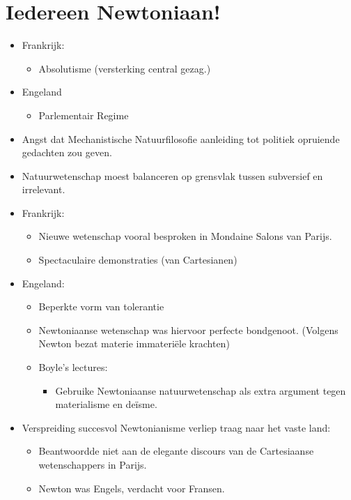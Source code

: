 \documentclass{article}
\begin{document}
  \section{Iedereen Newtoniaan!}
    \begin{itemize}
      \item Frankrijk:
      \begin{itemize}
        \item Absolutisme (versterking central gezag.)
      \end{itemize}
      \item Engeland
      \begin{itemize}
        \item Parlementair Regime
      \end{itemize}
      \item Angst dat Mechanistische Natuurfilosofie aanleiding tot politiek opruiende gedachten zou geven.
      \item Natuurwetenschap moest balanceren op grensvlak tussen subversief en irrelevant.
      \item Frankrijk:
      \begin{itemize}
        \item Nieuwe wetenschap vooral besproken in Mondaine Salons van Parijs.
        \item Spectaculaire demonstraties (van Cartesianen)
      \end{itemize}
      \item Engeland:
      \begin{itemize}
        \item Beperkte vorm van tolerantie
        \item Newtoniaanse wetenschap was hiervoor perfecte bondgenoot. (Volgens Newton bezat materie immateri\"ele krachten)
        \item Boyle's lectures:
        \begin{itemize}
          \item Gebruike Newtoniaanse natuurwetenschap als extra argument tegen materialisme en de\"isme.
        \end{itemize}
      \end{itemize}
      \item Verspreiding succesvol Newtonianisme verliep traag naar het vaste land:
      \begin{itemize}
        \item Beantwoordde niet aan de elegante discours van de Cartesiaanse wetenschappers in Parijs.
        \item Newton was Engels, verdacht voor Fransen. 

\end{itemize}
\end{itemize}
\end{document}
